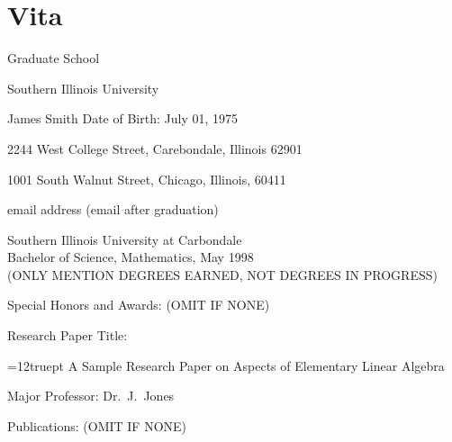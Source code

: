 

\chapter*{Vita}



\setlength{\baselineskip}{14pt}
\setlength{\parindent}{0pt}
\setlength{\parskip}{14pt}

\centerline{Graduate School}
\centerline{Southern Illinois University}

\bigskip
James Smith \hfill Date of Birth: July 01, 1975 \qquad 

2244 West College Street, Carebondale, Illinois 62901

1001 South Walnut Street, Chicago, Illinois, 60411 

\vskip12pt
email address (email after graduation)

\vskip12pt

Southern Illinois University at Carbondale\\
Bachelor of Science, Mathematics, May 1998 \\
(ONLY MENTION DEGREES EARNED, NOT DEGREES IN PROGRESS)

\vspace{14pt}
Special Honors and Awards: (OMIT IF NONE)

\vspace{14pt}
Research Paper Title:

\vspace{-14pt}  %
{\leftskip=12truept
A Sample Research Paper on Aspects of Elementary Linear Algebra
\par}

\vspace{14pt}
Major Professor: Dr.\ J.\ Jones

\vspace{14pt}
Publications: (OMIT IF NONE)


